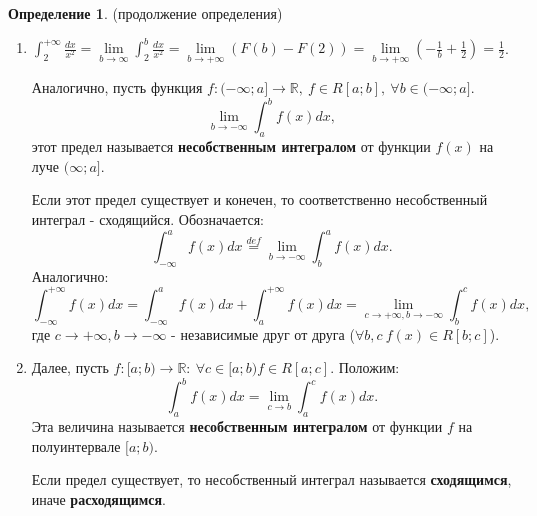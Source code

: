 \documentclass{report}
\theoremstyle{definition}
\newtheorem*{definition}{Определение}
\begin{document}
\begin{definition}
    (продолжение определения)

    \begin{enumerate}
        \item $\int_{2}^{+\infty}\frac{dx}{x^2} = \underset{b\rightarrow\infty}{\lim}\int_{2}^{b}\frac{dx}{x^2} =
                  \underset{b\rightarrow+\infty}{\lim}(F(b) - F(2)) = \underset{b\rightarrow+\infty}{\lim}(-\frac{1}{b} +
                  \frac{1}{2}) = \frac{1}{2}$.

              Аналогично, пусть функция $f:(-\infty;a]\rightarrow\mathbb{R}, \ f\in R[a;b], \ \forall b \in (-\infty;a]$.
              \begin{equation*}
                  \underset{b\rightarrow-\infty}{\lim}\int_{a}^{b}f(x)dx,
              \end{equation*}
              этот предел называется \textbf{несобственным интегралом} от функции $f(x)$ на луче $(\infty;a]$.

              Если этот предел существует и конечен, то соответственно несобственный интеграл - сходящийся. Обозначается:
              \begin{equation*}
                  \int_{-\infty}^{a}f(x)dx \overset{def}{=}\underset{b\rightarrow-\infty}{\lim}\int_{b}^{a}f(x)dx.
              \end{equation*}
              Аналогично:
              \begin{equation*}
                  \int_{-\infty}^{+\infty}f(x)dx = \int_{-\infty}^{a}f(x)dx + \int_{a}^{+\infty}f(x)dx = \underset{c
                      \rightarrow+\infty, b\rightarrow-\infty}{\lim}\int_{b}^{c}f(x)dx,
              \end{equation*}
              где $c\rightarrow+\infty, b\rightarrow-\infty$ - независимые друг от друга ($\forall b,c \ f(x)\in
                  R[b;c]$).

        \item Далее, пусть $f:[a;b)\rightarrow\mathbb{R}: \ \forall c \in [a;b) f\in R[a;c]$. Положим:
                          \begin{equation*}
                              \int_{a}^{b}f(x)dx = \underset{c\rightarrow b}{\lim}\int_{a}^{c}f(x)dx.
                          \end{equation*}
                          Эта величина называется \textbf{несобственным интегралом} от функции $f$ на полуинтервале $[a;b)$.

                                  Если предел существует, то несобственный интеграл называется \textbf{сходящимся}, иначе \textbf{расходящимся}.


\end{enumerate}
\end{definition}
\end{document}

